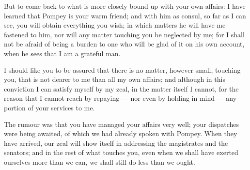  But to come back to what is more closely bound up with your own affairs: I have learned that Pompey is your warm friend; and with him as consul, so far as I can see, you will obtain everything you wish; in which matters he will have me fastened to him, nor will any matter touching you be neglected by me; for I shall not be afraid of being a burden to one who will be glad of it on his own account, when he sees that I am a grateful man.

 I should like you to be assured that there is no matter, however small, touching you, that is not dearer to me than all my own affairs; and although in this conviction I can satisfy myself by my zeal, in the matter itself I cannot, for the reason that I cannot reach by repaying --- nor even by holding in mind --- any portion of your services to me.

 The rumour was that you have managed your affairs very well; your dispatches were being awaited, of which we had already spoken with Pompey. When they have arrived, our zeal will show itself in addressing the magistrates and the senators; and in the rest of what touches you, even when we shall have exerted ourselves more than we can, we shall still do less than we ought.

